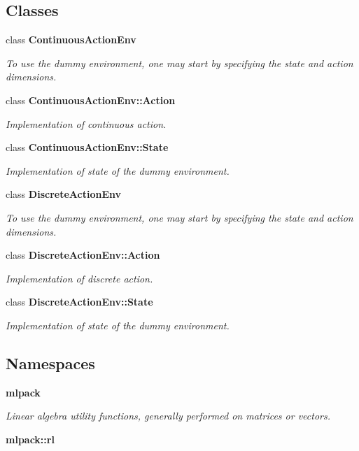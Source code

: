 \subsection*{Classes}
\begin{DoxyCompactItemize}
\item 
class \textbf{ Continuous\+Action\+Env}
\begin{DoxyCompactList}\small\item\em To use the dummy environment, one may start by specifying the state and action dimensions. \end{DoxyCompactList}\item 
class \textbf{ Continuous\+Action\+Env\+::\+Action}
\begin{DoxyCompactList}\small\item\em Implementation of continuous action. \end{DoxyCompactList}\item 
class \textbf{ Continuous\+Action\+Env\+::\+State}
\begin{DoxyCompactList}\small\item\em Implementation of state of the dummy environment. \end{DoxyCompactList}\item 
class \textbf{ Discrete\+Action\+Env}
\begin{DoxyCompactList}\small\item\em To use the dummy environment, one may start by specifying the state and action dimensions. \end{DoxyCompactList}\item 
class \textbf{ Discrete\+Action\+Env\+::\+Action}
\begin{DoxyCompactList}\small\item\em Implementation of discrete action. \end{DoxyCompactList}\item 
class \textbf{ Discrete\+Action\+Env\+::\+State}
\begin{DoxyCompactList}\small\item\em Implementation of state of the dummy environment. \end{DoxyCompactList}\end{DoxyCompactItemize}
\subsection*{Namespaces}
\begin{DoxyCompactItemize}
\item 
 \textbf{ mlpack}
\begin{DoxyCompactList}\small\item\em Linear algebra utility functions, generally performed on matrices or vectors. \end{DoxyCompactList}\item 
 \textbf{ mlpack\+::rl}
\end{DoxyCompactItemize}


